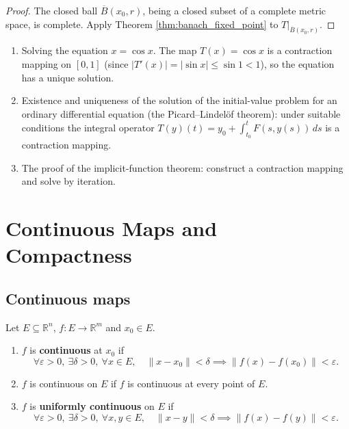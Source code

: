 \begin{proof}
The closed ball $\overline{B}(x_0, r)$, being a closed subset of a complete metric space, is complete. Apply Theorem \ref{thm:banach_fixed_point} to $T|_{\overline{B}(x_0, r)}$.
\end{proof}

\begin{example}\label{ex:contraction_applications}
\begin{enumerate}[label=(\roman*)]
    \item Solving the equation $x = \cos x$. The map $T(x) = \cos x$ is a contraction mapping on $[0, 1]$ (since $|T'(x)| = |\sin x| \le \sin 1 < 1$), so the equation has a unique solution.
    \item Existence and uniqueness of the solution of the initial-value problem for an ordinary differential equation (the Picard--Lindel\"of theorem): under suitable conditions the integral operator $T(y)(t) = y_0 + \int_{t_0}^t F(s, y(s)) \, ds$ is a contraction mapping.
    \item The proof of the implicit-function theorem: construct a contraction mapping and solve by iteration.
\end{enumerate}
\end{example}

\section{Continuous Maps and Compactness}

\subsection{Continuous maps}

\begin{definition}\label{def:continuous_map}
Let $E \subseteq \mathbb{R}^n$, $f: E \to \mathbb{R}^m$ and $x_0 \in E$.
\begin{enumerate}[label=(\roman*)]
    \item $f$ is \textbf{continuous} at $x_0$ if
    \[
    \forall \varepsilon > 0,\ \exists \delta > 0,\ \forall x \in E,\quad \|x - x_0\| < \delta \implies \|f(x) - f(x_0)\| < \varepsilon.
    \]
    \item $f$ is continuous on $E$ if $f$ is continuous at every point of $E$.
    \item $f$ is \textbf{uniformly continuous} on $E$ if
    \[
    \forall \varepsilon > 0,\ \exists \delta > 0,\ \forall x, y \in E,\quad \|x - y\| < \delta \implies \|f(x) - f(y)\| < \varepsilon.
    \]
\end{enumerate}
\end{definition}


